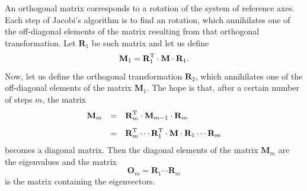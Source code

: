 An orthogonal matrix corresponds to a rotation of the system of
reference axes. Each step of Jacobi's algorithm is to find an
rotation, which annihilates one of the off-diagonal elements of
the matrix resulting from that orthogonal transformation. Let
$\textbf{R}_1$ be such matrix and let us define
\begin{equation}
  \textbf{M}_1 = \textbf{R}^{\mathop\textrm{T}}_1\cdot\textbf{M}\cdot\textbf{R}_1.
\end{equation}
Now, let us define the orthogonal transformation $\textbf{R}_2$,
which annihilates one of the off-diagonal elements of the matrix
$\textbf{M}_1$. The hope is that, after a certain number of steps
$m$, the matrix
\begin{equation}
  \begin{array}{lcl}
    \textbf{M}_m & = &\textbf{R}^{\mathop\textrm{T}}_m\cdot\textbf{M}_{m-1}\cdot{\textbf
    R}_m\\*[2ex]
      & = &\textbf{R}^{\mathop\textrm{T}}_m\cdots\textbf{R}^{\mathop\textrm{T}}_1\cdot\textbf{M}\cdot{\textbf
      R}_1\cdots\textbf{R}_m
  \end{array}
\end{equation}
becomes a diagonal matrix. Then the diagonal elements of the
matrix $\textbf{M}_m$ are the eigenvalues and the matrix
\begin{equation}
    \textbf{O}_m = \textbf{R}_1\cdots\textbf{R}_m
\end{equation}
is the matrix containing the eigenvectors.

